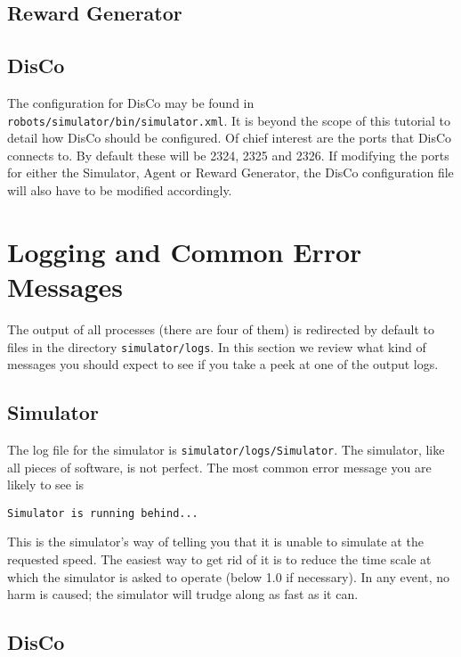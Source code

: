 \documentclass[12pt]{article}
\begin{document}
\subsection{Reward Generator}


\subsection{DisCo}

The configuration for DisCo may be found in 
\verb+robots/simulator/bin/simulator.xml+. It is beyond the scope of this
tutorial to detail how DisCo should be configured. Of chief interest are the
ports that DisCo connects to. By default these will be 2324, 2325 and 2326.
If modifying the ports for either the Simulator, Agent or Reward Generator,
the DisCo configuration file will also have to be modified accordingly.

\section{Logging and Common Error Messages}

The output of all processes (there are four of them) is redirected by default
to files in the directory \verb+simulator/logs+. In this section we review
what kind of messages you should expect to see if you take a peek at one of
the output logs.

\subsection{Simulator}

The log file for the simulator is \verb+simulator/logs/Simulator+. The 
simulator, like all pieces of software, is not perfect. The most common
error message you are likely to see is

\begin{verbatim}
Simulator is running behind...
\end{verbatim}

This is the simulator's way of telling you that it is unable to simulate
at the requested speed. The easiest way to get rid of it is to reduce the
time scale at which the simulator is asked to operate (below 1.0 if necessary).
In any event, no harm is caused; the simulator will trudge along as fast as it
can.

\subsection{DisCo}
\end{document}
